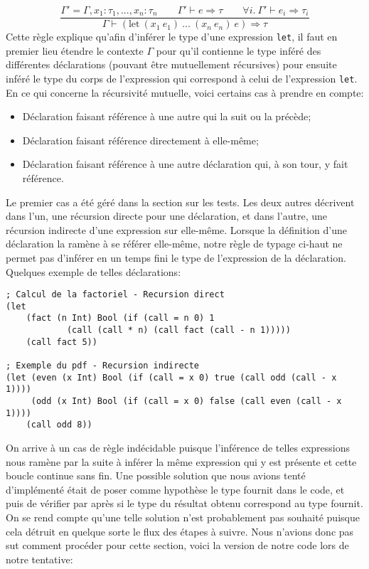 \documentclass[10pt, titlepage]{article}
\begin{document}
\begin{equation*}
    \frac{\Gamma' = \Gamma, x_1 : \tau_1, ..., x_n : \tau_n \qquad \Gamma'
    \vdash e \Rightarrow \tau \qquad \forall i. \ \Gamma' \vdash e_i
    \Rightarrow \tau_i}{\Gamma \vdash (\text{let} \ (x_1 \ e_1) \ ... \
    (x_n \ e_n) \ e) \Rightarrow \tau}
\end{equation*}
Cette règle explique qu'afin d'inférer le type d'une expression \texttt{let},
il faut en premier lieu étendre le contexte \(\Gamma\) pour qu'il contienne le
type inféré des différentes déclarations (pouvant être mutuellement récursives)
pour ensuite inféré le type du corps de l'expression qui correspond à celui de
l'expression \texttt{let}. En ce qui concerne la récursivité mutuelle, voici
certains cas à prendre en compte:
\begin{itemize}
    \item Déclaration faisant référence à une autre qui la suit ou la précède;
    \item Déclaration faisant référence directement à elle-même;
    \item Déclaration faisant référence à une autre déclaration qui, à son
    tour, y fait référence.
\end{itemize}
Le premier cas a été géré dans la section sur les tests. Les deux autres
décrivent dans l'un, une récursion directe pour une déclaration, et dans
l'autre, une récursion indirecte d'une expression sur elle-même. Lorsque la
définition d'une déclaration la ramène à se référer elle-même, notre règle de
typage ci-haut ne permet pas d'inférer en un temps fini le type de l'expression
de la déclaration. Quelques exemple de telles déclarations:
\begin{lstlisting}[language=elisp]
; Calcul de la factoriel - Recursion direct
(let
    (fact (n Int) Bool (if (call = n 0) 1
            (call (call * n) (call fact (call - n 1)))))
    (call fact 5))
    
; Exemple du pdf - Recursion indirecte
(let (even (x Int) Bool (if (call = x 0) true (call odd (call - x 1))))
     (odd (x Int) Bool (if (call = x 0) false (call even (call - x 1))))
    (call odd 8))
\end{lstlisting}
On arrive à un cas de règle indécidable puisque l'inférence de telles
expressions nous ramène par la suite à inférer la même expression qui y est
présente et cette boucle continue sans fin. Une possible solution que nous
avions tenté d'implémenté était de poser comme hypothèse le type fournit dans
le code, et puis de vérifier par après si le type du résultat obtenu correspond
au type fournit. On se rend compte qu'une telle solution n'est probablement pas
souhaité puisque cela détruit en quelque sorte le flux des étapes à suivre.
Nous n'avions donc pas sut comment procéder pour cette section, voici la
version de notre code lors de notre tentative:
\end{document}
